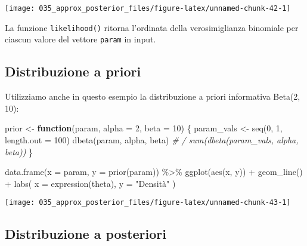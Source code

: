 \documentclass[
]{memoir}
\newenvironment{Shaded}{\begin{snugshade}}{\end{snugshade}}
\newcommand{\AttributeTok}[1]{\textcolor[rgb]{0.77,0.63,0.00}{#1}}
\newcommand{\CommentTok}[1]{\textcolor[rgb]{0.56,0.35,0.01}{\textit{#1}}}
\newcommand{\ControlFlowTok}[1]{\textcolor[rgb]{0.13,0.29,0.53}{\textbf{#1}}}
\newcommand{\DecValTok}[1]{\textcolor[rgb]{0.00,0.00,0.81}{#1}}
\newcommand{\FunctionTok}[1]{\textcolor[rgb]{0.00,0.00,0.00}{#1}}
\newcommand{\NormalTok}[1]{#1}
\newcommand{\OtherTok}[1]{\textcolor[rgb]{0.56,0.35,0.01}{#1}}
\newcommand{\SpecialCharTok}[1]{\textcolor[rgb]{0.00,0.00,0.00}{#1}}
\newcommand{\StringTok}[1]{\textcolor[rgb]{0.31,0.60,0.02}{#1}}
\begin{document}
\begin{center}\texttt{[image: 035\_approx\_posterior\_files/figure-latex/unnamed-chunk-42-1]} \end{center}

La funzione \texttt{likelihood()} ritorna l'ordinata della verosimiglianza binomiale per ciascun valore del vettore \texttt{param} in input.

\hypertarget{distribuzione-a-priori-1}{%
\subsection{Distribuzione a priori}\label{distribuzione-a-priori-1}}

Utilizziamo anche in questo esempio la distribuzione a priori informativa Beta(2, 10):

\begin{Shaded}
\begin{Highlighting}[]
\NormalTok{prior }\OtherTok{\textless{}{-}} \ControlFlowTok{function}\NormalTok{(param, }\AttributeTok{alpha =} \DecValTok{2}\NormalTok{, }\AttributeTok{beta =} \DecValTok{10}\NormalTok{) \{}
\NormalTok{  param\_vals }\OtherTok{\textless{}{-}} \FunctionTok{seq}\NormalTok{(}\DecValTok{0}\NormalTok{, }\DecValTok{1}\NormalTok{, }\AttributeTok{length.out =} \DecValTok{100}\NormalTok{)}
  \FunctionTok{dbeta}\NormalTok{(param, alpha, beta) }\CommentTok{\# / sum(dbeta(param\_vals, alpha, beta))}
\NormalTok{\}}

\FunctionTok{data.frame}\NormalTok{(}\AttributeTok{x =}\NormalTok{ param, }\AttributeTok{y =} \FunctionTok{prior}\NormalTok{(param)) }\SpecialCharTok{\%\textgreater{}\%}
  \FunctionTok{ggplot}\NormalTok{(}\FunctionTok{aes}\NormalTok{(x, y)) }\SpecialCharTok{+}
  \FunctionTok{geom\_line}\NormalTok{() }\SpecialCharTok{+}
  \FunctionTok{labs}\NormalTok{(}
    \AttributeTok{x =} \FunctionTok{expression}\NormalTok{(theta),}
    \AttributeTok{y =} \StringTok{"Densità"}
\NormalTok{  )}
\end{Highlighting}
\end{Shaded}

\begin{center}\texttt{[image: 035\_approx\_posterior\_files/figure-latex/unnamed-chunk-43-1]} \end{center}

\hypertarget{distribuzione-a-posteriori-1}{%
\subsection{Distribuzione a posteriori}\label{distribuzione-a-posteriori-1}}
\end{document}
